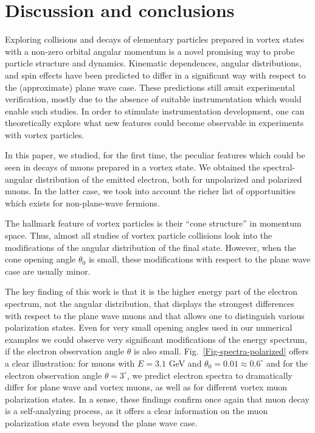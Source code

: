 \documentclass[aps,prd,longbibliography,nofootinbib,amsthm,amsmath,amssymb,amsfonts,notitlepage]{revtex4-1}
\begin{document}
\section{Discussion and conclusions}\label{section-discussion}

Exploring collisions and decays of elementary particles prepared in vortex states with a non-zero orbital angular momentum
is a novel promising way to probe particle structure and dynamics.
Kinematic dependences, angular distributions, and spin effects have been predicted to
differ in a significant way with respect to the (approximate) plane wave case.
These predictions still await experimental verification, mostly due to the absence of suitable instrumentation
which would enable such studies. In order to stimulate instrumentation development,
one can theoretically explore what new features could become observable in experiments with vortex particles.

In this paper, we studied, for the first time, the peculiar features
which could be seen in decays of muons prepared in a vortex state.
We obtained the spectral-angular distribution of the emitted electron, both for unpolarized and polarized muons.
In the latter case, we took into account the richer list of opportunities which exists
for non-plane-wave fermions.

The hallmark feature of vortex particles is their ``cone structure'' in momentum space.
Thus, almost all studies of vortex particle collisions look into the modifications of the angular distribution
of the final state. However, when the cone opening angle $\theta_0$ is small,
these modifications with respect to the plane wave case are usually minor.

The key finding of this work is that it is the higher energy part of the electron spectrum, not the angular distribution,
that displays the strongest differences with respect to the plane wave muons and that
allows one to distinguish various polarization states.
Even for very small opening angles used in our numerical examples
we could observe very significant modifications of the energy spectrum, if the electron observation
angle $\theta$ is also small.
Fig.~\ref{Fig-spectra-polarized} offers a clear illustration:
for muons with $E= 3.1$ GeV and $\theta_0 = 0.01 \approx 0.6^\circ$ and for the electron observation angle $\theta = 3^\circ$,
we predict electron spectra to dramatically differ
for plane wave and vortex muons, as well as for different vortex muon polarization states.
In a sense, these findings confirm once again that muon decay is a self-analyzing process,
as it offers a clear information on the muon polarization state even beyond the plane wave case.
\end{document}
